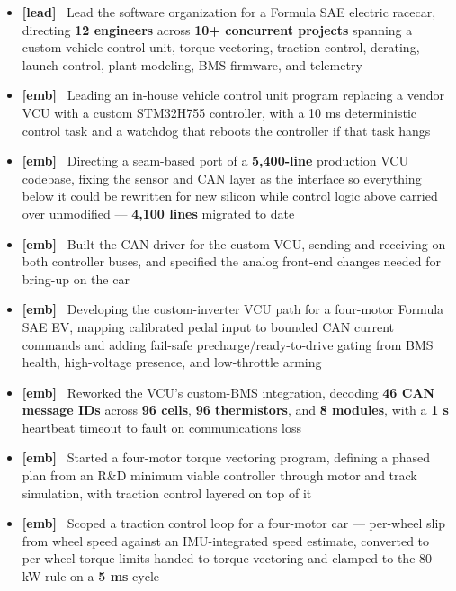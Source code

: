 \documentclass[10pt,letterpaper]{article}
\newcommand{\vtag}[1]{\textbf{[#1]}~}
\begin{document}
\orgline{\spartanracing}
\begin{itemize}
  \item \vtag{lead} Lead the software organization for a Formula SAE electric racecar, directing \textbf{12 engineers} across \textbf{10+ concurrent projects} spanning a custom vehicle control unit, torque vectoring, traction control, derating, launch control, plant modeling, BMS firmware, and telemetry
  \item \vtag{emb} Leading an in-house vehicle control unit program replacing a vendor VCU with a custom STM32H755 controller, with a 10 ms deterministic control task and a watchdog that reboots the controller if that task hangs
  \item \vtag{emb} Directing a seam-based port of a \textbf{5,400-line} production VCU codebase, fixing the sensor and CAN layer as the interface so everything below it could be rewritten for new silicon while control logic above carried over unmodified --- \textbf{4,100 lines} migrated to date
  \item \vtag{emb} Built the CAN driver for the custom VCU, sending and receiving on both controller buses, and specified the analog front-end changes needed for bring-up on the car
  \item \vtag{emb} Developing the custom-inverter VCU path for a four-motor Formula SAE EV, mapping calibrated pedal input to bounded CAN current commands and adding fail-safe precharge/ready-to-drive gating from BMS health, high-voltage presence, and low-throttle arming
  \item \vtag{emb} Reworked the VCU's custom-BMS integration, decoding \textbf{46 CAN message IDs} across \textbf{96 cells}, \textbf{96 thermistors}, and \textbf{8 modules}, with a \textbf{1 s} heartbeat timeout to fault on communications loss
  \item \vtag{emb} Started a four-motor torque vectoring program, defining a phased plan from an R\&D minimum viable controller through motor and track simulation, with traction control layered on top of it
  \item \vtag{emb} Scoped a traction control loop for a four-motor car --- per-wheel slip from wheel speed against an IMU-integrated speed estimate, converted to per-wheel torque limits handed to torque vectoring and clamped to the 80 kW rule on a \textbf{5 ms} cycle

\end{itemize}
\end{document}
